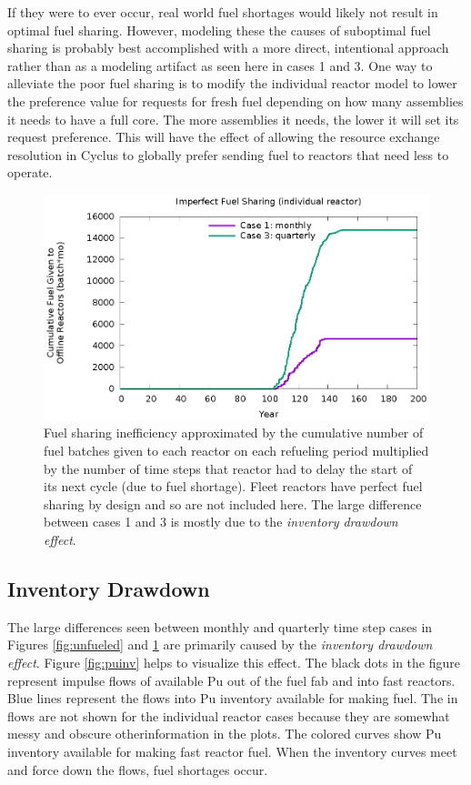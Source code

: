 \documentclass{style}
\begin{document}
If they were to ever occur, real world fuel shortages would likely not result
in optimal fuel sharing. However, modeling these the causes of suboptimal fuel
sharing is probably best accomplished with a more direct, intentional approach
rather than as a modeling artifact as seen here in cases 1 and 3.  One way to
alleviate the poor fuel sharing is to modify the individual reactor model to
lower the preference value for requests for fresh fuel depending on how many
assemblies it needs to have a full core.  The more assemblies it needs, the
lower it will set its request preference.  This will have the effect of
allowing the resource exchange resolution in Cyclus to globally prefer sending
fuel to reactors that need less to operate.

\begin{figure}[!h]
    \centering
    \includegraphics[width=1.0\columnwidth]{exp2/badshare.eps}
    \caption[Cumulative unnecessary idling fuel]{
        Fuel sharing inefficiency approximated by the cumulative number of
        fuel batches given to each reactor on each refueling period multiplied
        by the number of time steps that reactor had to delay the start of its
        next cycle (due to fuel shortage).  Fleet reactors have perfect fuel
        sharing by design and so are not included here. The large difference
        between cases 1 and 3 is mostly due to the \emph{inventory drawdown
        effect}. 
    }
    \label{fig:badshare}
\end{figure}

\subsection{Inventory Drawdown}

The large differences seen between monthly and quarterly time step cases in
Figures \ref{fig:unfueled} and \ref{fig:badshare} are
primarily caused by the \emph{inventory drawdown effect}.  Figure
\ref{fig:puinv} helps to visualize this effect.  The black dots in
the figure represent impulse flows of available Pu out of the fuel fab and
into fast reactors.  Blue lines represent the flows into Pu inventory
available for making fuel. The in flows are not shown for the individual
reactor cases because they are somewhat messy and obscure otherinformation in
the plots. The colored curves show Pu inventory available for making fast
reactor fuel.  When the inventory curves meet and force down the flows, fuel
shortages occur. 
\end{document}
